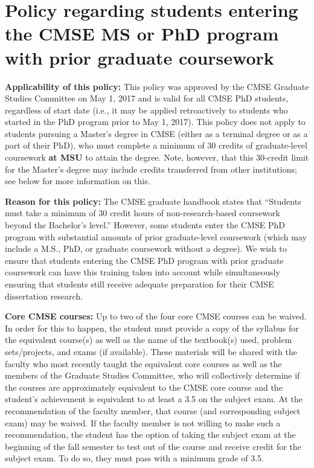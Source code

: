 \section{Policy regarding students entering the CMSE MS or PhD program with prior graduate coursework}
\label{sec:prior_coursework}

\vspace{4mm}
\noindent
\textbf{Applicability of this policy:} This policy was
approved by the CMSE Graduate Studies Committee on May 1, 2017 and is
valid for all CMSE PhD students, regardless of start date (i.e., it
may be applied retroactively to students who started in the PhD
program prior to May 1, 2017).  This policy does not apply to students
pursuing a Master's degree in CMSE (either as a terminal degree or as
a part of their PhD), who must complete a
minimum of 30 credits of graduate-level coursework \textbf{at MSU} to attain the
degree.  Note, however, that this 30-credit limit for the Master's
degree may include credits transferred from
other institutions; see below for more information on this.

\vspace{2mm}
\noindent
\textbf{Reason for this policy:} The CMSE graduate handbook states
that ``Students must take a minimum of 30 credit hours of
non-research-based coursework beyond the Bachelor’s level.''  However,
some students enter the CMSE PhD program with substantial amounts of
prior graduate-level coursework (which may include a M.S., PhD, or
graduate coursework without a degree).  We wish to ensure that
students entering the CMSE PhD program with prior graduate coursework
can have this training taken into account while simultaneously
ensuring that students still receive adequate preparation for their
CMSE dissertation research.

\vspace{2mm}
\noindent
\textbf{Core CMSE courses:} Up to two of the four core CMSE courses
can be waived.  In order for this to happen, the student must provide
a copy of the syllabus for the equivalent course(s) as well as the
name of the textbook(s) used, problem sets/projects, and exams (if
available).  These materials will be shared with the faculty who most
recently taught the equivalent core courses as well as the members of
the Graduate Studies Committee, who will collectively determine if the
courses are approximately equivalent to the CMSE core course and the
student’s achievement is equivalent to at least a 3.5 on the subject
exam.  At the recommendation of the faculty member, that course (and
corresponding subject exam) may be waived.  If the faculty member is
not willing to make such a recommendation, the student has the option
of taking the subject exam at the beginning of the fall semester to
test out of the course and receive credit for the subject exam.  To do
so, they must pass with a minimum grade of 3.5.

